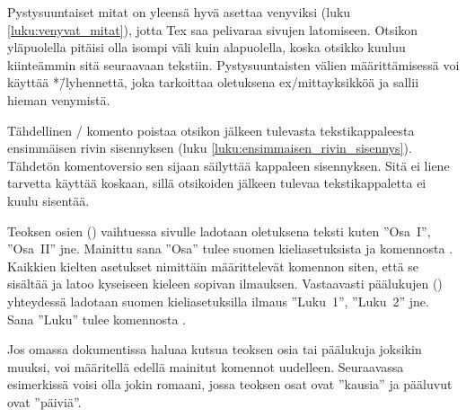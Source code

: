 \begin{koodilohkosis}
\end{koodilohkosis}

Pystysuuntaiset mitat on yleensä hyvä asettaa venyviksi (luku
\ref{luku:venyvat_mitat}), jotta Tex saa pelivaraa sivujen latomiseen.
Otsikon yläpuolella pitäisi olla isompi väli kuin alapuolella, koska
otsikko kuuluu kiinteämmin sitä seuraavaan tekstiin. Pystysuuntaisten
välien määrittämisessä voi käyttää *\=/lyhennettä, joka tarkoittaa
oletuksena ex\-/mittayksikköä ja sallii hieman venymistä.

\begin{koodilohkosis}
\end{koodilohkosis}

Tähdellinen \-/ komento poistaa otsikon jälkeen
tulevasta tekstikappaleesta ensimmäisen rivin sisennyksen (luku
\ref{luku:ensimmaisen_rivin_sisennys}). Tähdetön komentoversio
 sen sijaan säilyttää kappaleen sisennyksen. Sitä
ei liene tarvetta käyttää koskaan, sillä otsikoiden jälkeen tulevaa
tekstikappaletta ei kuulu sisentää.

Teoksen osien () vaihtuessa sivulle ladotaan oletuksena
teksti kuten ''Osa~I'', ''Osa~II'' jne. Mainittu sana ''Osa'' tulee
suomen kieliasetuksista ja komennosta . Kaikkien
kielten asetukset nimittäin määrittelevät komennon 
siten, että se sisältää ja latoo kyseiseen kieleen sopivan ilmauksen.
Vastaavasti päälukujen () yhteydessä ladotaan suomen
kieliasetuksilla ilmaus ''Luku~1'', ''Luku~2'' jne. Sana ''Luku'' tulee
komennosta .

Jos omassa dokumentissa haluaa kutsua teoksen osia tai päälukuja
joksikin muuksi, voi määritellä edellä mainitut komennot uudelleen.
Seuraavassa esimerkissä voisi olla jokin romaani, jossa teoksen osat
ovat ''kausia'' ja pääluvut ovat ''päiviä''.

\begin{koodilohkosis}
\addto{\captionsfinnish}{
  \renewcommand{\partname}{Kausi}
  \renewcommand{\chaptername}{Päivä}
}
\end{koodilohkosis}

